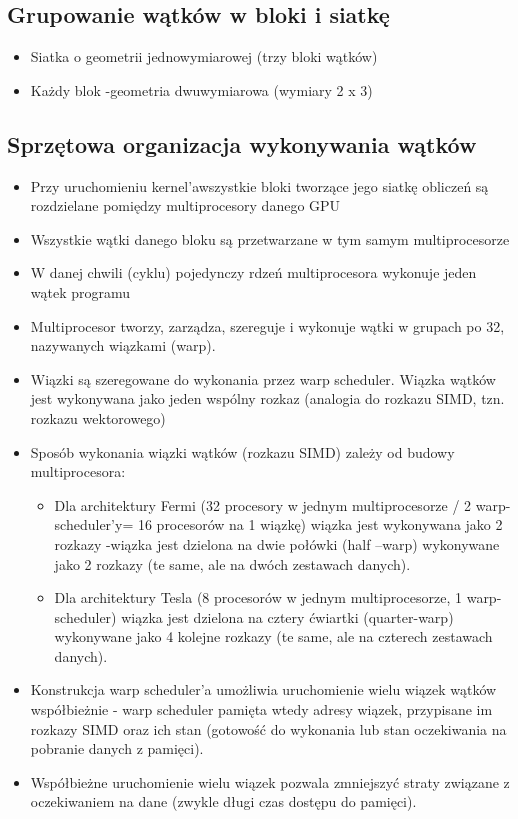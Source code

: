 \documentclass[a4paper,twoside]{article}
\begin{document}
			\subsection*{Grupowanie wątków w bloki i siatkę}
			\begin{itemize}
				\item Siatka o geometrii jednowymiarowej (trzy bloki wątków)
				\item Każdy blok -geometria dwuwymiarowa (wymiary 2 x 3)
			\end{itemize}
			\subsection*{Sprzętowa organizacja wykonywania wątków}
				\begin{itemize}
					\item Przy uruchomieniu kernel’awszystkie bloki tworzące jego siatkę obliczeń są rozdzielane pomiędzy multiprocesory danego GPU
					\item Wszystkie wątki danego bloku są przetwarzane w tym samym multiprocesorze
					\item W danej chwili (cyklu) pojedynczy rdzeń multiprocesora wykonuje jeden wątek programu
					\item Multiprocesor tworzy, zarządza, szereguje i wykonuje wątki w grupach po 32, nazywanych wiązkami (warp).
					\item Wiązki są szeregowane do wykonania przez warp scheduler. Wiązka wątków jest wykonywana jako jeden wspólny rozkaz (analogia do rozkazu SIMD, tzn. rozkazu wektorowego)
					\item Sposób wykonania wiązki wątków (rozkazu SIMD) zależy od budowy multiprocesora:
					\begin{itemize}
						\item Dla architektury Fermi (32 procesory w jednym multiprocesorze / 2 warp-scheduler’y= 16 procesorów na 1 wiązkę) wiązka jest wykonywana jako 2 rozkazy -wiązka jest dzielona na dwie połówki (half –warp) wykonywane jako 2 rozkazy (te same, ale na dwóch zestawach danych).
						\item Dla architektury Tesla (8 procesorów w jednym multiprocesorze, 1 warp-scheduler) wiązka jest dzielona na cztery ćwiartki (quarter-warp) wykonywane jako 4 kolejne rozkazy (te same, ale na czterech zestawach danych).
					\end{itemize}
					\item Konstrukcja warp scheduler’a umożliwia uruchomienie wielu wiązek wątków współbieżnie - warp scheduler pamięta wtedy adresy wiązek, przypisane im rozkazy SIMD oraz ich stan (gotowość do wykonania lub stan oczekiwania na pobranie danych z pamięci).
					\item Współbieżne uruchomienie wielu wiązek pozwala zmniejszyć straty związane z oczekiwaniem na dane (zwykle długi czas dostępu do pamięci).
				\end{itemize}
				
\end{document}
